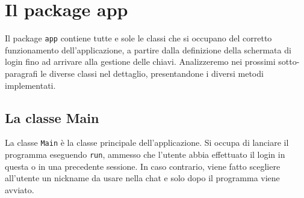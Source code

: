 \section{Il package app}
Il package \texttt{app} contiene tutte e sole le classi che si occupano del corretto
funzionamento dell'applicazione, a partire dalla definizione della schermata di login
fino ad arrivare alla gestione delle chiavi. Analizzeremo nei prossimi sotto-paragrafi
le diverse classi nel dettaglio, presentandone i diversi metodi implementati.

\subsection{La classe Main}
La classe \texttt{Main} è la classe principale dell'applicazione. Si occupa di lanciare il programma
eseguendo \texttt{run}, ammesso che l'utente abbia effettuato il login in questa o in una precedente
sessione. In caso contrario, viene fatto scegliere all'utente un nickname da usare nella chat
e solo dopo il programma viene avviato.